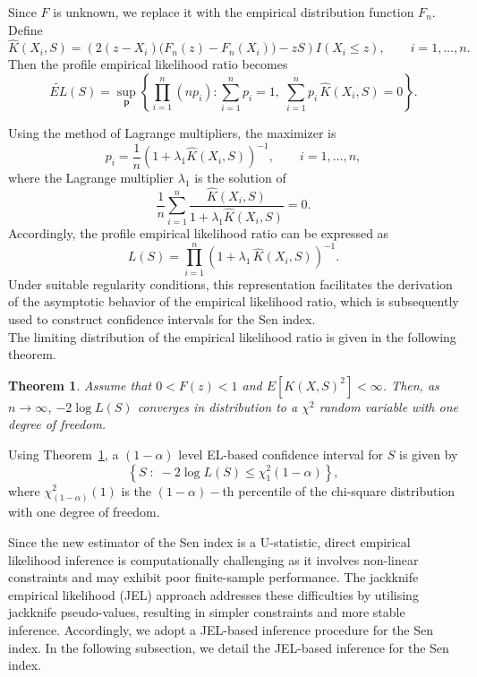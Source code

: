 \documentclass[11pt]{article}
\newtheorem{theorem}{Theorem}
\begin{document}
Since $F$ is unknown, we replace it with the empirical distribution function $F_n$.
Define
\begin{equation*}
\widehat{K}(X_i,S)
=
\left( 2(z - X_i)\big(F_n(z)-F_n(X_i)\big) - zS \right)
I(X_i \le z), \qquad i=1,\dots,n.
\end{equation*}
Then the profile empirical likelihood ratio becomes
\begin{equation*}
\tilde{EL}(S)
=
\sup_{\mathbf p}
\left\{
\prod_{i=1}^n (np_i)
:
\sum_{i=1}^n p_i = 1,\;
\sum_{i=1}^n p_i\, \widehat{K}(X_i,S)=0
\right\}.
\end{equation*}

Using the method of Lagrange multipliers, the maximizer is
\begin{equation*}
p_i
=
\frac{1}{n}
\left(1 + \lambda_1 \widehat{K}(X_i,S)\right)^{-1},
\qquad i=1,\dots,n,
\end{equation*}
where the Lagrange multiplier $\lambda_1$ is the solution of
\begin{equation*}
\frac{1}{n}
\sum_{i=1}^{n}
\frac{ \widehat{K}(X_i,S) }
     { 1+\lambda_1 \widehat{K}(X_i,S) }
= 0.
\end{equation*}
Accordingly, the profile empirical likelihood ratio can be expressed as
\begin{equation*}
L(S)
=
\prod_{i=1}^{n}
\left(1 + \lambda_1\, \widehat{K}(X_i,S)\right)^{-1}.
\end{equation*}Under suitable regularity conditions, this representation facilitates the derivation of the asymptotic behavior of the empirical likelihood ratio, which is subsequently used to construct confidence intervals for the Sen index.\\
The limiting distribution of the empirical likelihood ratio is given in the following theorem.
\begin{theorem}
\label{thm:el}
Assume that $0 < F(z) < 1$ and $E[K(X,S)^2] < \infty$.
Then, as $n \to \infty$, $-2 \log L(S)$ converges in distribution to a
$\chi^2$ random variable with one degree of freedom.
\end{theorem}

Using Theorem~\ref{thm:el}, a $(1-\alpha)$ level EL-based confidence interval for $S$ is given by
\[
\left\{
S \;:\; -2\log L(S) \le \chi^2_{1}(1-\alpha)
\right\},
\] where $\chi^2_{(1-\alpha)}(1)$ is the $(1-\alpha)-$th percentile of the chi-square distribution with one degree of freedom.

Since the new estimator of the Sen index is a U-statistic, direct empirical likelihood inference is computationally challenging as it involves non-linear constraints and may exhibit poor finite-sample performance. The jackknife empirical likelihood (JEL) approach addresses these difficulties by utilising jackknife pseudo-values, resulting in simpler constraints and more stable inference. Accordingly, we adopt a JEL-based inference procedure for the Sen index.
In the following subsection, we detail the JEL-based inference for the Sen index.
\end{document}
